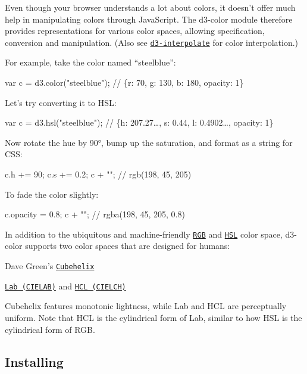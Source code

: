 Even though your browser understands a lot about colors, it doesn’t offer much help in manipulating colors through Java\+Script. The d3-\/color module therefore provides representations for various color spaces, allowing specification, conversion and manipulation. (Also see \href{https://github.com/d3/d3-interpolate}{\tt d3-\/interpolate} for color interpolation.)

For example, take the color named “steelblue”\+:


\begin{DoxyCode}
var c = d3.color("steelblue"); // \{r: 70, g: 130, b: 180, opacity: 1\}
\end{DoxyCode}


Let’s try converting it to H\+SL\+:


\begin{DoxyCode}
var c = d3.hsl("steelblue"); // \{h: 207.27…, s: 0.44, l: 0.4902…, opacity: 1\}
\end{DoxyCode}


Now rotate the hue by 90°, bump up the saturation, and format as a string for C\+SS\+:


\begin{DoxyCode}
c.h += 90;
c.s += 0.2;
c + ""; // rgb(198, 45, 205)
\end{DoxyCode}


To fade the color slightly\+:


\begin{DoxyCode}
c.opacity = 0.8;
c + ""; // rgba(198, 45, 205, 0.8)
\end{DoxyCode}


In addition to the ubiquitous and machine-\/friendly \href{#rgb}{\tt R\+GB} and \href{#hsl}{\tt H\+SL} color space, d3-\/color supports two color spaces that are designed for humans\+:


\begin{DoxyItemize}
\item Dave Green’s \href{#cubehelix}{\tt Cubehelix}
\item \href{#lab}{\tt Lab (C\+I\+E\+L\+AB)} and \href{#hcl}{\tt H\+CL (C\+I\+E\+L\+CH)}
\end{DoxyItemize}

Cubehelix features monotonic lightness, while Lab and H\+CL are perceptually uniform. Note that H\+CL is the cylindrical form of Lab, similar to how H\+SL is the cylindrical form of R\+GB.

\subsection*{Installing}

